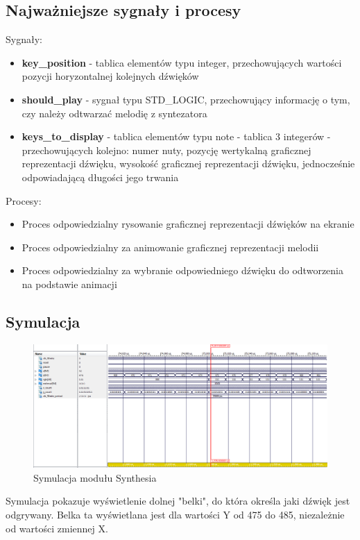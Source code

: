 \documentclass[a4paper]{report}
\begin{document}
		\subsection{Najważniejsze sygnały i procesy}
		{\Large Sygnały:}
			\begin{itemize}
				\item \textbf{key\_position} - tablica elementów typu integer, przechowujących wartości pozycji horyzontalnej kolejnych dźwięków
				\item \textbf{should\_play} - sygnał typu STD\_LOGIC, przechowujący informację o tym, czy należy odtwarzać melodię z syntezatora
				\item \textbf{keys\_to\_display} - tablica elementów typu note - tablica 3 integerów - przechowujących kolejno: numer nuty, pozycję wertykalną graficznej reprezentacji dźwięku, wysokość graficznej reprezentacji dźwięku, jednocześnie odpowiadającą długości jego trwania
			\end{itemize}
		{\Large Procesy:}
			\begin{itemize}
			\item Proces odpowiedzialny rysowanie graficznej reprezentacji dźwięków na ekranie\\
						
			\item Proces odpowiedzialny za animowanie graficznej reprezentacji melodii\\
									
			\item Proces odpowiedzialny za wybranie odpowiedniego dźwięku do odtworzenia na podstawie animacji\\
									
			\end{itemize}
	\begin{landscape}
		\subsection{Symulacja}
		\begin{figure}[h!]
					\centering
					\includegraphics[width=1.6\textwidth]{synthesia_symulacja2.png}
					\caption{Symulacja modułu Synthesia}
				\end{figure}
\justify Symulacja pokazuje wyświetlenie dolnej "belki", do która określa jaki dźwięk jest odgrywany. Belka ta wyświetlana jest dla wartości Y od 475 do 485, niezależnie od wartości zmiennej X.
		\end{landscape}
	
\end{document}
